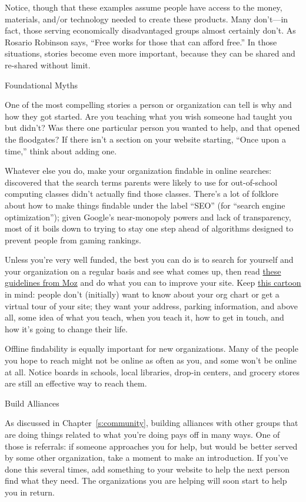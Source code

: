 Notice, though that these examples assume people have access to the
money, materials, and/or technology needed to create these products.
Many don't---in fact, those serving economically disadvantaged groups
almost certainly don't. As Rosario Robinson says, ``Free works for those
that can afford free.'' In those situations, stories become even more
important, because they can be shared and re-shared without limit.

\begin{aside}{Foundational Myths}

One of the most compelling stories a person or organization can tell
is why and how they got started. Are you teaching what you wish
someone had taught you but didn't? Was there one particular person you
wanted to help, and that opened the floodgates? If there isn't a
section on your website starting, ``Once upon a time,'' think about
adding one.

\end{aside}

Whatever else you do, make your organization findable in online
searches: \cite{DiSa2014b} discovered that the search terms parents
were likely to use for out-of-school computing classes didn't actually
find those classes. There's a lot of folklore about how to make things
findable under the label ``SEO'' (for ``search engine optimization''); given
Google's near-monopoly powers and lack of transparency, most of it boils
down to trying to stay one step ahead of algorithms designed to prevent
people from gaming rankings.

Unless you're very well funded, the best you can do is to search for
yourself and your organization on a regular basis and see what comes
up, then read \href{https://moz.com/learn/seo/on-page-factors}{these guidelines from Moz} and do what
you can to improve your site. Keep \href{https://xkcd.com/773/}{this cartoon} in
mind: people don't (initially) want to know about your org chart or
get a virtual tour of your site; they want your address, parking
information, and above all, some idea of what you teach, when you
teach it, how to get in touch, and how it's going to change their
life.

Offline findability is equally important for new organizations. Many of
the people you hope to reach might not be online as often as you, and
some won't be online at all. Notice boards in schools, local libraries,
drop-in centers, and grocery stores are still an effective way to reach
them.

\begin{aside}{Build Alliances}

As discussed in Chapter~\ref{s:community}, building alliances with
other groups that are doing things related to what you're doing pays
off in many ways. One of those is referrals: if someone approaches you
for help, but would be better served by some other organization, take
a moment to make an introduction. If you've done this several times,
add something to your website to help the next person find what they
need. The organizations you are helping will soon start to help you in
return.

\end{aside}

